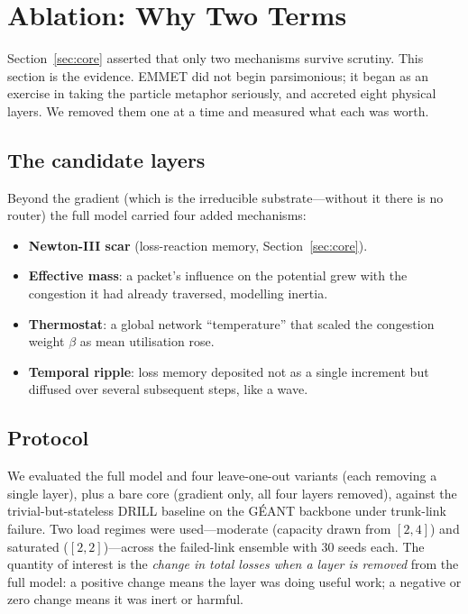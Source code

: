 \section{Ablation: Why Two Terms}
\label{sec:ablation}

Section~\ref{sec:core} asserted that only two mechanisms survive scrutiny. This
section is the evidence. EMMET did not begin parsimonious; it began as an
exercise in taking the particle metaphor seriously, and accreted eight physical
layers. We removed them one at a time and measured what each was worth.

\subsection{The candidate layers}

Beyond the gradient (which is the irreducible substrate---without it there is no
router) the full model carried four added mechanisms:

\begin{itemize}
\item \textbf{Newton-III scar} (loss-reaction memory, Section~\ref{sec:core}).
\item \textbf{Effective mass}: a packet's influence on the potential grew with
the congestion it had already traversed, modelling inertia.
\item \textbf{Thermostat}: a global network ``temperature'' that scaled the
congestion weight $\beta$ as mean utilisation rose.
\item \textbf{Temporal ripple}: loss memory deposited not as a single
increment but diffused over several subsequent steps, like a wave.
\end{itemize}

\subsection{Protocol}

We evaluated the full model and four leave-one-out variants (each removing a
single layer), plus a bare core (gradient only, all four layers removed),
against the trivial-but-stateless DRILL baseline on the G\'EANT backbone under
trunk-link failure. Two load regimes were used---moderate (capacity drawn from
$[2,4]$) and saturated ($[2,2]$)---across the failed-link ensemble with 30
seeds each. The quantity of interest is the \emph{change in total losses when a
layer is removed} from the full model: a positive change means the layer was
doing useful work; a negative or zero change means it was inert or harmful.


